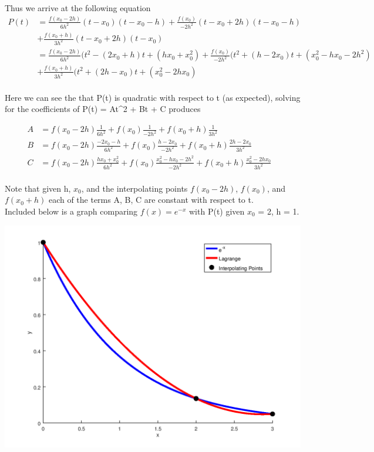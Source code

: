 \documentclass{jhwhw}
\begin{document}
    Thus we arrive at the following equation
    \begin{align*}
	P(t) &= 
	    \frac{f(x_0 - 2h)}{6h^2}(t - x_0)(t - x_0 - h)
	    + \frac{f(x_0)}{-2h^2}(t - x_0 + 2h)(t - x_0 - h) \\
	    &+ \frac{f(x_0 + h)}{3h^2}(t - x_0 + 2h)(t - x_0) &\\
	&=
	    \frac{f(x_0 - 2h)}{6h^2}(t^2 - (2x_0 + h)t + (hx_0+x_0^2)
	    + \frac{f(x_0)}{-2h^2}(t^2 + (h-2x_0)t + (x_0^2 - hx_0 - 2h^2) \\
	    &+ \frac{f(x_0 + h)}{3h^2}(t^2 + (2h - x_0)t + (x_0^2 - 2hx_0) &\\
    \end{align*}

    Here we can see the that P(t) is quadratic with respect to t (as expected),
    solving for the coefficients of P(t) = At^2 + Bt + C produces

    \begin{align*}
	A &= f(x_0-2h)\frac{1}{6h^2} + f(x_0)\frac{1}{-2h^2} + f(x_0+h)\frac{1}{3h^2} &\\
	B &= f(x_0-2h)\frac{-2x_0-h}{6h^2} + f(x_0)\frac{h-2x_0}{-2h^2} + f(x_0+h)\frac{2h-2x_0}{3h^2} &\\
	C &= f(x_0-2h)\frac{hx_0 + x_0^2}{6h^2} + f(x_0)\frac{x_0^2 - hx_0 - 2h^2}{-2h^2} 
	    + f(x_0+h)\frac{x_0^2 - 2hx_0}{3h^2} &\\
    \end{align*}

    Note that given h, $x_0$, and the interpolating points $f(x_0-2h)$, $f(x_0)$, and $f(x_0+h)$ each of the
    terms A, B, C are constant with respect to t. \\ 
    Included below is a graph comparing $f(x) = e^{-x}$ with P(t) 
    given $x_0$ = 2, h = 1.

    \bigbreak

    \includegraphics[scale=0.75]{p2}
\end{document}
